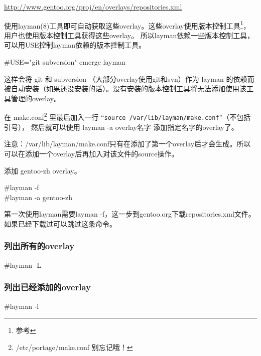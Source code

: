 \url{http://www.gentoo.org/proj/en/overlays/repositories.xml}

使用layman(8)工具即可自动获取这些overlay。这些overlay使用版本控制工具\footnote{参考 }，用户也使用版本控制工具获得这些overlay。
所以layman依赖一些版本控制工具，可以用USE控制layman依赖的版本控制工具。

\begin{code}
\#USE="git subversion" emerge layman
\end{code}

这样会将 git 和 subversion （大部分overlay使用git和svn）作为 layman 的依赖而被自动安装（如果还没安装的话）。没有安装的版本控制工具将无法添加使用该工具管理的overlay。

在 make.conf\footnote{ /etc/portage/make.conf 别忘记哦！} 里最后加入一行 “{\tt source /var/lib/layman/make.conf}”（不包括引号）， 然后就可以使用 layman -a overlay名字 添加指定名字的overlay了。

\begin{insertnote}
注意：/var/lib/layman/make.conf只有在添加了第一个overlay后才会生成。所以可以在添加一个overlay后再加入对该文件的source操作。
\end{insertnote}

\begin{example}{添加 gentoo-zh overlay。}
\begin{code}
\#layman -f \\
\#layman -a gentoo-zh
\end{code}

第一次使用layman需要layman -f，这一步到gentoo.org下载repositories.xml文件。如果已经下载过可以跳过这条命令。

\end{example}

\subsubsection*{列出所有的overlay}

\begin{code}
\#layman -L
\end{code}

\subsubsection*{列出已经添加的overlay}

\begin{code}
\#layman -l
\end{code}

